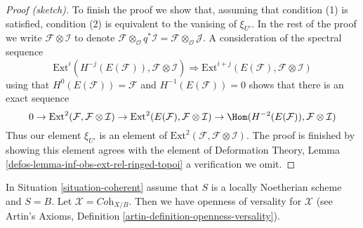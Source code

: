 \begin{proof}[Proof (sketch)]
\medskip\noindent
To finish the proof we show that, assuming that condition (1) is satisfied,
condition (2) is equivalent to the vanising of $\xi_{U'}$. In the rest
of the proof we write $\mathcal{F} \otimes \mathcal{I}$ to denote
$\mathcal{F} \otimes_\mathcal{O} q^*\mathcal{I} =
\mathcal{F} \otimes_\mathcal{O} \mathcal{J}$. A consideration
of the spectral sequence
$$
\text{Ext}^i(H^{-j}(E(\mathcal{F})), \mathcal{F} \otimes \mathcal{I})
\Rightarrow
\text{Ext}^{i + j}(E(\mathcal{F}), \mathcal{F} \otimes \mathcal{I})
$$
using that $H^0(E(\mathcal{F})) = \mathcal{F}$ and
$H^{-1}(E(\mathcal{F})) = 0$
shows that there is an exact sequence
$$
0 \to
\text{Ext}^2(\mathcal{F}, \mathcal{F} \otimes \mathcal{I}) \to
\text{Ext}^2(E(\mathcal{F}), \mathcal{F} \otimes \mathcal{I}) \to
\Hom(H^{-2}(E(\mathcal{F})), \mathcal{F} \otimes \mathcal{I})
$$
Thus our element $\xi_{U'}$ is an element of
$\text{Ext}^2(\mathcal{F}, \mathcal{F} \otimes \mathcal{I})$.
The proof is finished by showing this element agrees with the
element of
Deformation Theory, Lemma \ref{defos-lemma-inf-obs-ext-rel-ringed-topoi}
a verification we omit.
\end{proof}

\begin{lemma}
\label{lemma-coherent-defo-thy-general}
In Situation \ref{situation-coherent} assume that
$S$ is a locally Noetherian scheme and $S = B$.
Let $\mathcal{X} = \textit{Coh}_{X/B}$.
Then we have openness of versality for $\mathcal{X}$ (see
Artin's Axioms, Definition \ref{artin-definition-openness-versality}).
\end{lemma}


